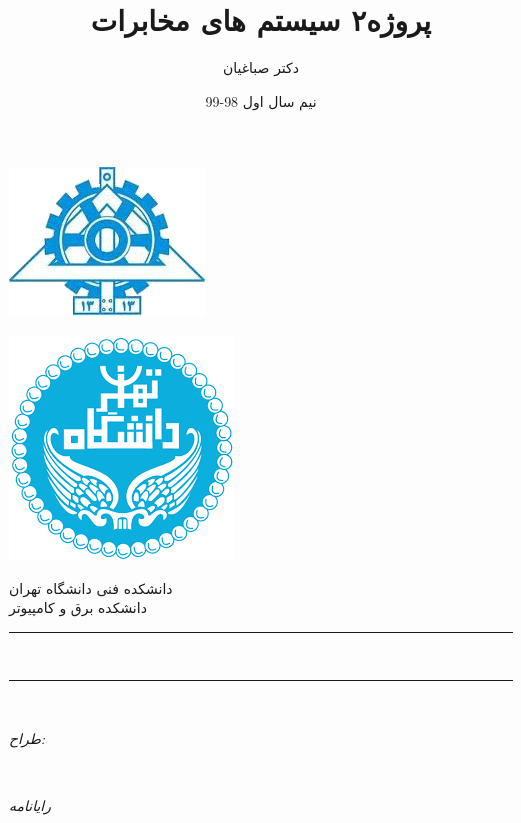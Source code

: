 \documentclass[14pt, professionalfont]{article}
\title{ پروژه۲ سیستم های مخابرات 
	}
\author{دکتر صباغیان}
\date{نیم سال اول 98-99 }
\makeatletter
\let\thetitle\@title
\let\thedate\@date
\makeatother
\begin{document}
	
\begin{titlepage}
	\centering
	\vspace*{2 cm}
	\begin{minipage}{\textwidth}
		\begin{minipage}{0.5\textwidth}
			\flushright
			\includegraphics[scale = 0.55]{ece.png}
			\vspace*{0.5 cm}
		\end{minipage}
		\begin{minipage}{0.5\textwidth}
			\flushleft
			\includegraphics[scale = 0.30]{ut.png}
			\vspace*{0.5 cm}
		\end{minipage}		
	\end{minipage}
	
	\textsc{\LARGE دانشکده فنی دانشگاه تهران}\\[0.5 cm]
	\textsc{\Large دانشکده برق و کامپیوتر}\\[0.5 cm]
	\rule{\linewidth}{0.2 mm}
	{ \LARGE  \bfseries \vspace{5pt} \thetitle}\\
	\vspace{5 pt}
	{\LARGE
		}
	
	\rule{\linewidth}{0.2 mm} \\[1.5 cm]
	\begin{minipage}{0.2\textwidth}
		\begin{flushright} \large
			\emph{طراح:}\\
			
		\end{flushright}
	\end{minipage}~
	\begin{minipage}{0.3\textwidth}
		\begin{flushleft} \large
			\emph{رایانامه} \\
		\end{flushleft}
	\end{minipage}\\[2 cm]
	{\large \thedate}\\[2 cm]
	\vfill
\end{titlepage}
	
\end{document}
